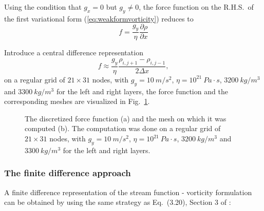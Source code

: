 \documentclass[11pt]{article}
\numberwithin{figure}{section}  %
\numberwithin{equation}{section}  %
\begin{document}
\begin{multicols}{2}
Using the condition that $g_x=0$ but $g_y\neq0$, the force function on the R.H.S.\ of the first variational form (\ref{eq:weakformvorticity}) reduces to
\begin{equation}\label{eq:forcefunction}
    f = \dfrac{g_y}{\eta}\dfrac{\partial\rho}{\partial{x}}
\end{equation}

Introduce a central difference representation
\begin{equation}\label{eq:forcefunctionnumerical}
    f \approx \dfrac{g_y}{\eta}\dfrac{\rho_{i,j+1}-\rho_{i,j-1}}{2\Delta{x}},
\end{equation}
on a regular grid of $21\times31$ nodes, with $g_y=10\ m/s^2$, $\eta=10^{21}\ Pa\cdot{s}$, $3200\ kg/m^3$ and $3300\ kg/m^3$ for the left and right layers, the force function and the corresponding meshes are visualized in Fig.\ \ref{fig:forcefunction}.
\begin{figure}[!htb]
	\centering
	\caption{The discretized force function (a) and the mesh on which it was computed (b). The computation was done on a regular grid of $21\times31$ nodes, with $g_y=10\ m/s^2$, $\eta=10^{21}\ Pa\cdot{s}$, $3200\ kg/m^3$ and $3300\ kg/m^3$ for the left and right layers.}
	\label{fig:forcefunction}
\end{figure}

\subsubsection{The finite difference approach}

A finite difference representation of the stream function - vorticity formulation can be obtained by using the same strategy as Eq.\ (3.20), Section 3 of \citet{gerya2009introduction}:
\end{multicols}
\end{document}
